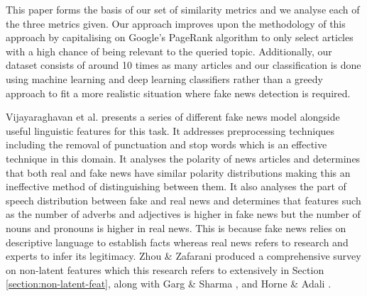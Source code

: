 \documentclass{article}
\begin{document}
This paper forms the basis of our set of similarity metrics and we analyse each of the three metrics given. Our approach improves upon the methodology of this approach by capitalising on Google's PageRank algorithm to only select articles with a high chance of being relevant to the queried topic. Additionally, our dataset consists of around 10 times as many articles and our classification is done using machine learning and deep learning classifiers rather than a greedy approach to fit a more realistic situation where fake news detection is required.

Vijayaraghavan et al. \cite{vijayaraghavan2020fake} presents a series of different fake news model alongside useful linguistic features for this task. It addresses preprocessing techniques including the removal of punctuation and stop words which is an effective technique in this domain. It analyses the polarity of news articles and determines that both real and fake news have similar polarity distributions making this an ineffective method of distinguishing between them. It also analyses the part of speech distribution between fake and real news and determines that features such as the number of adverbs and adjectives is higher in fake news but the number of nouns and pronouns is higher in real news. This is because fake news relies on descriptive language to establish facts whereas real news refers to research and experts to infer its legitimacy. Zhou \& Zafarani \cite{zhou2020survey} produced a comprehensive survey on non-latent features which this research refers to extensively in Section \ref{section:non-latent-feat}, along with Garg \& Sharma \cite{garg2022linguistic}, and Horne \& Adali \cite{horne2017}.

\label{section:methods}
\end{document}

